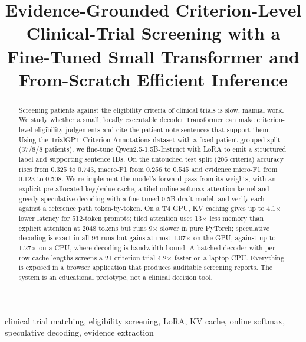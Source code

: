\documentclass[conference]{IEEEtran}
\begin{document}
\title{Evidence-Grounded Criterion-Level Clinical-Trial Screening with a Fine-Tuned Small Transformer and From-Scratch Efficient Inference}

\author{
}

\maketitle

\begin{abstract}
Screening patients against the eligibility criteria of clinical trials is slow, manual work. We study whether a small, locally executable decoder Transformer can make criterion-level eligibility judgements and cite the patient-note sentences that support them. Using the TrialGPT Criterion Annotations dataset with a fixed patient-grouped split (37/8/8 patients), we fine-tune Qwen2.5-1.5B-Instruct with LoRA to emit a structured label and supporting sentence IDs. On the untouched test split (206 criteria) accuracy rises from 0.325 to 0.743, macro-F1 from 0.256 to 0.545 and evidence micro-F1 from 0.123 to 0.508. We re-implement the model's forward pass from its weights, with an explicit pre-allocated key/value cache, a tiled online-softmax attention kernel and greedy speculative decoding with a fine-tuned 0.5B draft model, and verify each against a reference path token-by-token. On a T4 GPU, KV caching gives up to 4.1$\times$ lower latency for 512-token prompts; tiled attention uses 13$\times$ less memory than explicit attention at 2048 tokens but runs 9$\times$ slower in pure PyTorch; speculative decoding is exact in all 96 runs but gains at most 1.07$\times$ on the GPU, against up to 1.27$\times$ on a CPU, where decoding is bandwidth bound. A batched decoder with per-row cache lengths screens a 21-criterion trial 4.2$\times$ faster on a laptop CPU. Everything is exposed in a browser application that produces auditable screening reports. The system is an educational prototype, not a clinical decision tool.
\end{abstract}

\begin{IEEEkeywords}
clinical trial matching, eligibility screening, LoRA, KV cache, online softmax, speculative decoding, evidence extraction
\end{IEEEkeywords}
\end{document}
